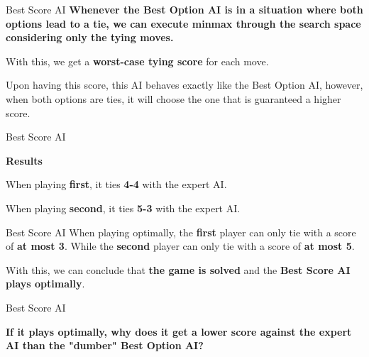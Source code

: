 \documentclass[11pt]{beamer}
\begin{document}
\begin{frame}{Best Score AI}
	\textbf{Whenever the Best Option AI is in a situation where both options lead to a tie,
	we can execute minmax through the search space considering only the tying moves.}

	\bigskip

	With this, we get a \textbf{worst-case tying score} for each move.

	\bigskip

	Upon having this score, this AI behaves exactly like the Best Option AI, however,
	when both options are ties, it will choose the one that is guaranteed a higher score.
\end{frame}

\begin{frame}{Best Score AI}
	\begin{center}
		\huge \textbf{Results}
	\end{center}

	\bigskip

	When playing \textbf{first}, it ties \textbf{4-4} with the expert AI.

	When playing \textbf{second}, it ties \textbf{5-3} with the expert AI.
\end{frame}

\begin{frame}{Best Score AI}
	When playing optimally, the \textbf{first} player can only tie with a score of \textbf{at most 3}.
	While the \textbf{second} player can only tie with a score of \textbf{at most 5}.

	\bigskip

	With this, we can conclude that \textbf{the game is solved} and the \textbf{Best Score AI plays optimally}.
\end{frame}

\begin{frame}{Best Score AI}
	\begin{center}
		\huge \textbf{If it plays optimally, why does it get a lower score against the expert AI than the "dumber" Best Option AI?}
	\end{center}
\end{frame}
\end{document}
